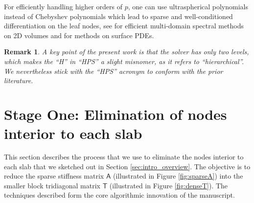 \documentclass[11pt]{amsart}
\newtheorem{remark}{Remark}%
\newcommand{\mtx}[1]{\bm{\mathsf{#1}}}
\begin{document}
For efficiently handling higher orders of $p$, one can use ultraspherical polynomials \cite{2013_olver_townsend_wellcond} instead of Chebyshev polynomials 
which lead to sparse and well-conditioned differentiation on the leaf nodes, see \cite{2020_spectral_townsend_fortunato,2021_fortunato_ultraspherical,aurentz2020symmetrizing}
for efficient multi-domain spectral methods on 2D volumes and \cite{fortunato2022_surface} for methods on surface PDEs.

\begin{remark}
A key point of the present work is that the solver has only \textit{two} levels,
which makes the ``H'' in ``HPS'' a slight misnomer, as it refers to ``hierarchical''. 
We nevertheless stick with the ``HPS'' acronym to conform with the prior literature.
\end{remark}

\section{Stage One: Elimination of nodes interior to each slab}
\label{sec:stageone}

This section describes the process that we use to eliminate 
the nodes interior to each slab that we sketched out in Section \ref{sec:intro_overview}.
The objective is to reduce the sparse stiffness matrix $\mtx{A}$ 
(illustrated in Figure \ref{fig:sparseA}) into the smaller block
tridiagonal matrix $\mtx{T}$ (illustrated in Figure \ref{fig:denseT}).
The techniques described form the core algorithmic innovation
of the manuscript.
\end{document}
